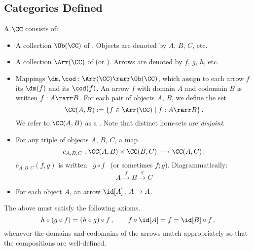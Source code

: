 \documentclass[12pt]{article}
\begin{document}
%


\subsection{Categories Defined}
\begin{mydefinition}
A  $\CC$ consists of:
\begin{itemize}
  \item A collection $\Ob(\CC)$ of . Objects are denoted by $A$, $B$, $C$, etc.
  \item A collection $\Arr(\CC)$ of  (or ). Arrows are denoted by $f$, $g$, $h$, etc.
  \item Mappings $\dm, \cod : \Arr(\CC) \rarr \Ob(\CC)$, which assign to each arrow $f$ its  $\dm(f)$ and its  $\cod(f)$. An arrow $f$ with domain $A$ and codomain $B$  is written
  $f:A\rarr B$.  For each pair of objects $A$, $B$, we define the  set
  \[ \CC(A,B) := \{ f \in \Arr(\CC) \mid f : A \rarr B \} \, . \]
  We refer to $\CC(A, B)$ as a . Note that distinct hom-sets are \emph{disjoint}.
    \item For any triple of objects $A$, $B$, $C$, a  map
    \[ c_{A,B,C} : \CC (A, B) \times \CC (B, C) \longrightarrow \CC (A, C)\,. \]
  $c_{A, B, C}(f, g)$ is written \ $g\circ\!f$ \ (or sometimes $f ; g$). Diagrammatically:
  \[ A \stackrel{f}{\longrightarrow} B \stackrel{g}{\longrightarrow} C \]
  \item For each object $A$, an  arrow $\id[A]:A\rightarrow A$.
\end{itemize}
The above must satisfy the following axioms.
\[ h \circ (g \circ f) = (h \circ g) \circ f \,,\qquad f \circ \id[A] = f = \id[B] \circ f\,. \]
whenever the domains and codomains of the arrows match appropriately so that the compositions are well-defined. \deq
\end{mydefinition}
\end{document}
